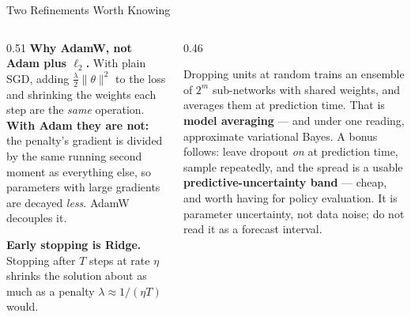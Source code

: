 \begin{frame}{Two Refinements Worth Knowing}
\begin{columns}[T]
\begin{column}{0.51\textwidth}
\small
\textbf{Why AdamW, not Adam plus $\ell_2$.} With plain SGD, adding $\tfrac{\lambda}{2}\lVert\theta\rVert^{2}$ to the loss and shrinking the weights each step are the \emph{same} operation. \textbf{With Adam they are not:} the penalty's gradient is divided by the same running second moment as everything else, so parameters with large gradients are decayed \emph{less}. AdamW decouples it.
\medskip

\textbf{Early stopping is Ridge.} Stopping after $T$ steps at rate $\eta$ shrinks the solution about as much as a penalty $\lambda\approx1/(\eta T)$ would.
\end{column}
\begin{column}{0.46\textwidth}
\begin{conceptbox}[title=\textbf{Dropout, read as a Bayesian}]\small
Dropping units at random trains an ensemble of $2^{m}$ sub-networks with shared weights, and averages them at prediction time. That is \textbf{model averaging} --- and under one reading, approximate variational Bayes.
\medskip
A bonus follows: leave dropout \emph{on} at prediction time, sample repeatedly, and the spread is a usable \textbf{predictive-uncertainty band} --- cheap, and worth having for policy evaluation. It is parameter uncertainty, not data noise; do not read it as a forecast interval.
\end{conceptbox}
\end{column}
\end{columns}
\vspace{1mm}
\end{frame}

